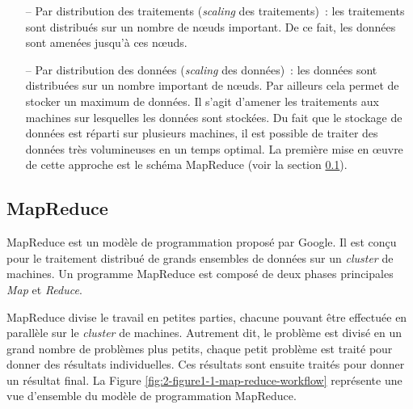 		
		\begin{itemize}
			\item[--] Par distribution des traitements (\textit{scaling} des traitements)~: les traitements sont distribués sur un nombre de n\oe{}uds important. De ce fait, les données sont amenées jusqu'à ces n\oe{}uds.
			
			\item[--] Par distribution des données (\textit{scaling} des données)~: les données sont distribuées sur un nombre important de n\oe{}uds. Par ailleurs cela permet  de stocker un maximum de données. Il s'agit d'amener les traitements aux machines sur lesquelles les données sont stockées. Du fait que le stockage de données est réparti sur plusieurs machines, il est possible de traiter des données très volumineuses en un temps optimal. La première mise en \oe{}uvre de cette approche est le schéma MapReduce (voir la section  \ref{mapreducesection}). 
		\end{itemize}
\subsection{MapReduce} \label{mapreducesection}

MapReduce est un modèle de programmation proposé par Google. Il est conçu pour   le traitement distribué de grands ensembles de données   sur un \textit{cluster} de machines. Un programme MapReduce est composé de deux phases principales   \textit{Map} et  \textit{Reduce}.

MapReduce divise le travail en petites parties, chacune pouvant être effectuée en parallèle sur le \textit{cluster} de machines. Autrement dit, le  problème est divisé en un grand nombre de problèmes plus petits, chaque petit problème est traité pour donner des résultats individuelles. Ces résultats sont ensuite traités pour donner un résultat final. 
La Figure 	\ref{fig:2-figure1-1-map-reduce-workflow} représente une vue d'ensemble du modèle de programmation MapReduce. 

